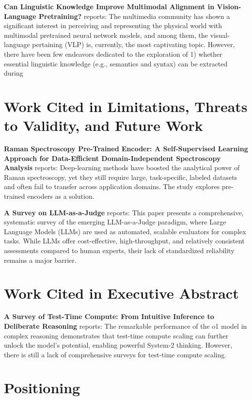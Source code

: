 \documentclass[10pt,twocolumn,letterpaper]{article}
\begin{document}
\textbf{Can Linguistic Knowledge Improve Multimodal Alignment in Vision-Language Pretraining?} \cite{arxiv_2308_12898} reports: The multimedia community has shown a significant interest in perceiving and representing the physical world with multimodal pretrained neural network models, and among them, the visual-language pertaining (VLP) is, currently, the most captivating topic. However, there have been few endeavors dedicated to the exploration of 1) whether essential linguistic knowledge (e.g., semantics and syntax) can be extracted during 


\section{Work Cited in Limitations, Threats to Validity, and Future Work}


\textbf{Raman Spectroscopy Pre-Trained Encoder: A Self-Supervised Learning Approach for Data-Efficient Domain-Independent Spectroscopy Analysis} \cite{doaj_001772c2113c476d9d5d40452c8e10e1} reports: Deep-learning methods have boosted the analytical power of Raman spectroscopy, yet they still require large, task-specific, labeled datasets and often fail to transfer across application domains. The study explores pre-trained encoders as a solution.

\textbf{A Survey on LLM-as-a-Judge} \cite{arxiv_2411_15594} reports: This paper presents a comprehensive, systematic survey of the emerging LLM-as-a-Judge paradigm, where Large Language Models (LLMs) are used as automated, scalable evaluators for complex tasks. While LLMs offer cost-effective, high-throughput, and relatively consistent assessments compared to human experts, their lack of standardized reliability remains a major barrier.


\section{Work Cited in Executive Abstract}


\textbf{A Survey of Test-Time Compute: From Intuitive Inference to Deliberate Reasoning} \cite{arxiv_2501_02497} reports: The remarkable performance of the o1 model in complex reasoning demonstrates that test-time compute scaling can further unlock the model's potential, enabling powerful System-2 thinking. However, there is still a lack of comprehensive surveys for test-time compute scaling.


\section{Positioning}
\end{document}
